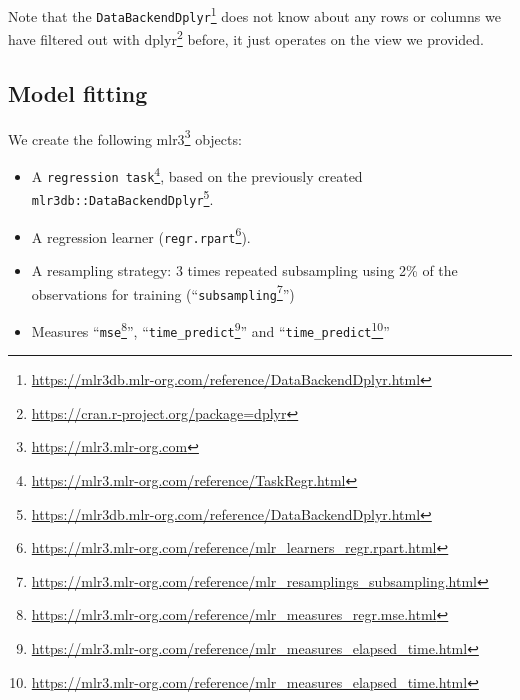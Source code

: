 \documentclass[12pt,]{scrbook}
\newenvironment{Shaded}{}{}
\newcommand{\KeywordTok}[1]{\textcolor[rgb]{0.00,0.00,1.00}{#1}}
\newcommand{\NormalTok}[1]{#1}
\newcommand{\OperatorTok}[1]{#1}
\providecommand{\tightlist}{%
  \setlength{\itemsep}{0pt}\setlength{\parskip}{0pt}}
\renewcommand{\href}[2]{#2\footnote{\url{#1}}}
\begin{document}
\begin{Shaded}
\end{Shaded}

Note that the \href{https://mlr3db.mlr-org.com/reference/DataBackendDplyr.html}{\texttt{DataBackendDplyr}} does not know about any rows or columns we have filtered out with \href{https://cran.r-project.org/package=dplyr}{dplyr} before, it just operates on the view we provided.

\hypertarget{model-fitting}{%
\subsection{Model fitting}\label{model-fitting}}

We create the following \href{https://mlr3.mlr-org.com}{mlr3} objects:

\begin{itemize}
\tightlist
\item
  A \href{https://mlr3.mlr-org.com/reference/TaskRegr.html}{\texttt{regression\ task}}, based on the previously created \href{https://mlr3db.mlr-org.com/reference/DataBackendDplyr.html}{\texttt{mlr3db::DataBackendDplyr}}.
\item
  A regression learner (\href{https://mlr3.mlr-org.com/reference/mlr_learners_regr.rpart.html}{\texttt{regr.rpart}}).
\item
  A resampling strategy: 3 times repeated subsampling using 2\% of the observations for training (``\href{https://mlr3.mlr-org.com/reference/mlr_resamplings_subsampling.html}{\texttt{subsampling}}'')
\item
  Measures ``\href{https://mlr3.mlr-org.com/reference/mlr_measures_regr.mse.html}{\texttt{mse}}'', ``\href{https://mlr3.mlr-org.com/reference/mlr_measures_elapsed_time.html}{\texttt{time\_predict}}'' and ``\href{https://mlr3.mlr-org.com/reference/mlr_measures_elapsed_time.html}{\texttt{time\_predict}}''
\end{itemize}
\end{document}
